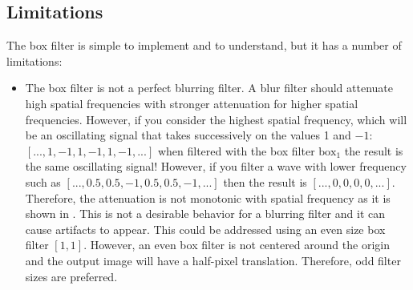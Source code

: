 \subsection{Limitations}

The box filter is simple to implement and to understand, but it has a number of limitations:

\begin{itemize}
\item {The box filter is not a perfect blurring filter. A blur filter should attenuate high spatial frequencies with stronger attenuation for higher spatial frequencies. However, if you consider the highest spatial frequency, which will be an oscillating signal that takes successively on the values 1 and $-1$: $\left[..., 1, -1, 1, -1, 1, -1, ... \right]$ when filtered with the box filter $\text{box}_{1}$ the result is the same oscillating signal! However, if you filter a wave with lower frequency such as $\left[..., 0.5, 0.5, -1, 0.5, 0.5, -1, ... \right]$ then the result is $\left[..., 0,0,0,0, ...\right]$. Therefore, the attenuation is not monotonic with spatial frequency as it is shown in \fig{\ref{fig:boxfilter}}. This is not a desirable behavior for a blurring filter and it can cause artifacts to appear. This could be addressed using an even size box filter $\left[1,1 \right]$. However, an even box filter is not centered around the origin and the output image will have a half-pixel translation. Therefore, odd filter sizes are preferred.}


\end{itemize}
